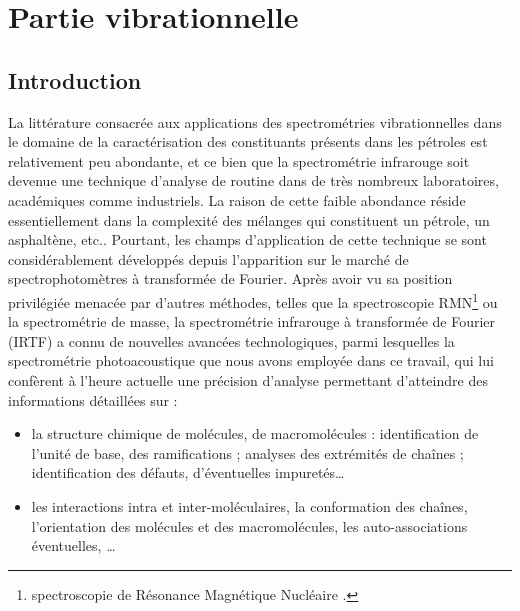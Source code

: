 \chapter{Partie vibrationnelle}
\renewcommand{\chaptername}{Chapitre}
\minitoc
\restoregeometry

\newpage



\section*{Introduction}

La littérature consacrée aux applications des spectrométries vibrationnelles dans le domaine de la caractérisation des constituants présents dans les pétroles est relativement peu abondante, et ce bien que la spectrométrie infrarouge soit devenue une technique d'analyse de \og routine \fg{} dans de très nombreux laboratoires, académiques comme industriels. La raison de cette faible abondance réside essentiellement dans la complexité des mélanges qui constituent un pétrole, un asphaltène, etc.. Pourtant, les champs d'application de cette technique se sont considérablement développés depuis l'apparition sur le marché de spectrophotomètres à transformée de Fourier.
Après avoir vu sa position privilégiée menacée par d'autres méthodes, telles que la spectroscopie RMN\footnote{\og spectroscopie de Résonance Magnétique Nucléaire \fg{}.} ou la spectrométrie de masse, la spectrométrie infrarouge à transformée de Fourier (IRTF) a connu de nouvelles avancées technologiques, parmi lesquelles la spectrométrie photoacoustique que nous avons employée dans ce travail, qui lui confèrent à l'heure actuelle une précision d'analyse permettant d'atteindre des informations détaillées sur :

\begin{itemize}
	\item la structure chimique de molécules, de macromolécules : identification de l'unité de base, des ramifications ; analyses des extrémités de chaînes ; identification des défauts, d'éventuelles impuretés\dots{}
	\item les interactions intra et inter-moléculaires, la conformation des chaînes, l'orientation des molécules et des macromolécules, les auto-associations éventuelles, \dots{}
\end{itemize}

